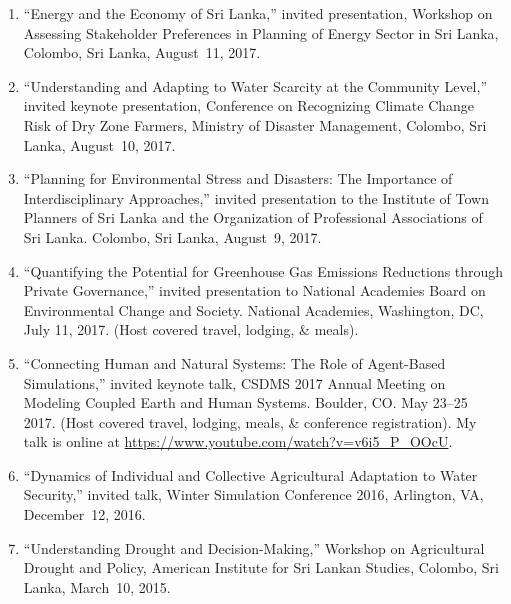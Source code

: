 \begin{enumerate}
\item ``Energy and the Economy of Sri Lanka,'' invited presentation, Workshop on Assessing Stakeholder Preferences in Planning of Energy Sector in Sri Lanka, Colombo, Sri Lanka, August~11, 2017.
\item ``Understanding and Adapting to Water Scarcity at the Community Level,'' invited keynote presentation, Conference on Recognizing Climate Change Risk of Dry Zone Farmers, Ministry of Disaster Management, Colombo, Sri Lanka, August~10, 2017.
\item ``Planning for Environmental Stress and Disasters: The Importance of Interdisciplinary Approaches,'' invited presentation to the Institute of Town Planners of Sri Lanka and the Organization of Professional Associations of Sri Lanka. Colombo, Sri Lanka, August~9, 2017.
\item ``Quantifying the Potential for Greenhouse Gas Emissions Reductions through Private Governance,'' invited presentation to National Academies Board on Environmental Change and Society. National Academies, Washington, DC, July 11, 2017. (Host covered travel, lodging, \& meals).
\item  ``Connecting Human and Natural Systems: The Role of Agent-Based Simulations,'' invited keynote talk, CSDMS 2017 Annual Meeting on Modeling Coupled Earth and Human Systems. Boulder, CO. May 23--25 2017. (Host covered travel, lodging, meals, \& conference registration). My talk is online at \url{https://www.youtube.com/watch?v=v6i5_P_OOcU}.
\item  ``Dynamics of Individual and Collective Agricultural Adaptation to Water Security,'' invited talk, Winter Simulation Conference 2016, Arlington, VA, December~12, 2016.
\item ``Understanding Drought and Decision-Making,'' Workshop on Agricultural Drought and Policy, American Institute for Sri Lankan Studies, Colombo, Sri Lanka, March~10, 2015.
\end{enumerate}

